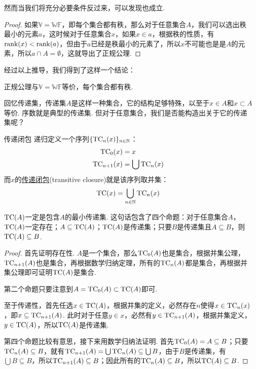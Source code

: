 \documentclass[main.tex]{subfiles}
\begin{document}
然而当我们将充分必要条件反过来，可以发现也成立.
\begin{proof}
    如果\(\mathbb{V}=\mathbb{WF}\)，即每个集合都有秩，那么对于任意集合\(A\)，我们可以选出秩最小的元素\(a\)，这时候对于任意集合\(x\)，如果\(x \in a\)，根据秩的性质，有\({\rm rank}(x) < {\rm rank}(a)\)，但由于\(a\)已经是秩最小的元素了，所以\(x\)不可能也是是\(A\)的元素，所以\(a \cap A = \emptyset\)，这就导出了正规公理.
\end{proof}

经过以上推导，我们得到了这样一个结论：
\begin{theorem}{}
    正规公理与\(\mathbb{V}=\mathbb{WF}\)等价，每个集合都有秩.
\end{theorem}

回忆传递集，传递集\(A\)是这样一种集合，它的结构足够特殊，以至于\(x \in A\)和\(x \subset A\)等价. 序数就是典型的传递集. 但对于任意集合，我们是否能构造出关于它的传递集呢？
\begin{definition}{传递闭包}
    递归定义一个序列\(\{{\rm TC}_n(x)\}_{n \in \mathbb{N}}\)：
    \[
        \begin{aligned}
            {\rm TC}_0(x) &= x \\
            {\rm TC}_{n+1}(x) &= \bigcup {\rm TC}_n(x)
        \end{aligned}
    \]
    而\(x\)的\uline{传递闭包}(transitive closure)就是该序列取并集：
    \[{\rm TC}(x) = \bigcup_{n \in \mathbb{N}}{\rm TC}_n(x)\]
\end{definition}

\({\rm TC}(A)\)一定是包含\(A\)的最小传递集. 这句话包含了四个命题：对于任意集合\(A\)，\({\rm TC}(A)\)一定存在；\(A \subseteq {\rm TC}(A)\)；\({\rm TC}(A)\)是传递集；只要\(B\)是传递集且\(A \subseteq B\)，则\({\rm TC}(A) \subseteq B\).

\begin{proof}
    首先证明存在性. \(A\)是一个集合，那么\({\rm TC}_0(A)\)也是集合，根据并集公理，\({\rm TC}_{n+1}(A)\)也是集合，再根据数学归纳定理，所有的\({\rm TC}_{n}(A)\)都是集合，再根据并集公理即可证明\({\rm TC}(A)\)是集合.

    第二个命题只要注意到\(A = {\rm TC}_0(A) \subset {\rm TC}(A)\)即可.

    至于传递性，首先任选\(x \in {\rm TC}(A)\)，根据并集的定义，必然存在\(n\)使得\(x \in {\rm TC}_n(x)\)，即\(x \subseteq {\rm TC}_{n+1}(A)\). 此时对于任意\(y \in x\)，必然有\(y \in {\rm TC}_{n+1}(A)\)，根据并集定义，\(y \in {\rm TC}(A)\)，所以\({\rm TC}(A)\)是传递集.

    第四个命题比较有意思，接下来用数学归纳法证明. 首先\({\rm TC}_0(A) = A \subseteq B\)；只要\({\rm TC}_n(A) \subseteq B\)，就有\({\rm TC}_{n+1}(A) = \bigcup {\rm TC}_n(A) \subseteq \bigcup B\)，由于\(B\)是传递集，有\(\bigcup B \subseteq B\)，所以\({\rm TC}_{n+1}(A) \subseteq B\)；因此所有的\({\rm TC}_{n}(A) \subseteq B\)，所以\({\rm TC}(A) \subseteq B\).
\end{proof}
\end{document}
